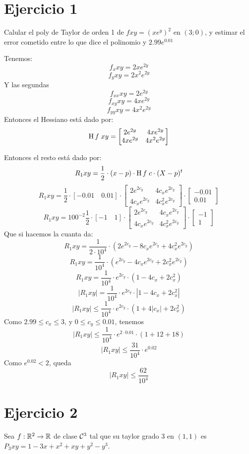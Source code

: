 \documentclass{article}
\begin{document}
\section*{Ejercicio 1}
Calular el poly de Taylor de orden 1 de $fxy = (xe^y)^2$ en $(3;0)$, y estimar el error cometido entre lo que dice el polinomio y $2.99e^{0.01}$

Tenemos:
\[f_x xy = 2xe^{2y}\]
\[f_y xy = 2x^2e^{2y}\]
Y las segundas
\[f_{xx} xy = 2e^{2y}\]
\[f_{xy} xy = 4xe^{2y}\]
\[f_{yy} xy = 4x^2e^{2y}\]
Entonces el Hessiano está dado por:
\[
	\operatorname{H} f \; xy = 
	\begin{bmatrix}
		2e^{2y} & 4xe^{2y} \\
		4xe^{2y} & 4x^2e^{2y}
	\end{bmatrix}
\]

Entonces el resto está dado por:
\[
	R_1 xy = \frac{1}{2} \cdot (x-p) \cdot \operatorname{H} f \; c \cdot (X - p)^t
\]
\[
	R_1 xy = \frac{1}{2} \cdot
	[-0.01 \quad 0.01] \cdot
	\begin{bmatrix}
		2e^{2c_y} & 4c_xe^{2c_y} \\
		4c_xe^{2c_y} & 4c_x^2e^{2c_y}
	\end{bmatrix} \cdot
	\begin{bmatrix}
		-0.01 \\
		0.01
	\end{bmatrix}
\]
\[
	R_1 xy = 100^{-2}\frac{1}{2} \cdot
	[-1 \quad 1] \cdot
	\begin{bmatrix}
		2e^{2c_y} & 4c_xe^{2c_y} \\
		4c_xe^{2c_y} & 4c_x^2e^{2c_y}
	\end{bmatrix} \cdot
	\begin{bmatrix}
		-1 \\
		1
	\end{bmatrix}
\]
Que si hacemos la cuanta da:
\[
	R_1 xy = \frac{1}{2 \cdot 10^4} \cdot (2e^{2c_y} - 8c_xe^{2c_y} + 4c_x^2e^{2c_y})
\]
\[
	R_1 xy = \frac{1}{10^4} \cdot (e^{2c_y} - 4c_xe^{2c_y} + 2c_x^2e^{2c_y})
\]
\[
	R_1 xy = \frac{1}{10^4} \cdot e^{2c_y}\cdot (1 - 4c_x + 2c_x^2)
\]
\[
	|R_1 xy| = \frac{1}{10^4} \cdot e^{2c_y}\cdot |1 - 4c_x + 2c_x^2|
\]
\[
	|R_1 xy| \leq \frac{1}{10^4} \cdot e^{2c_y}\cdot (1 + 4|c_x| + 2c_x^2)
\]
Como $2.99 \leq c_x \leq 3$, y $0 \leq c_y \leq 0.01$, tenemos
\[
	|R_1 xy| \leq \frac{1}{10^4} \cdot e^{2 \cdot 0.01}\cdot (1 + 12 + 18)
\]
\[
	|R_1 xy| \leq \frac{31}{10^4} \cdot e^{0.02} 
\]
Como $e^{0.02} < 2$, queda
\[
	|R_1 xy| \leq \frac{62}{10^4}
\]

\section*{Ejercicio 2}
Sea $f : \mathbb{R}^2 \to \mathbb{R}$ de clase $\mathcal{C}^3$ tal que su taylor grado 3 en $(1, 1)$ es $P_3 xy = 1-3x+x^2 + xy + y^2 - y^3$.
\end{document}
